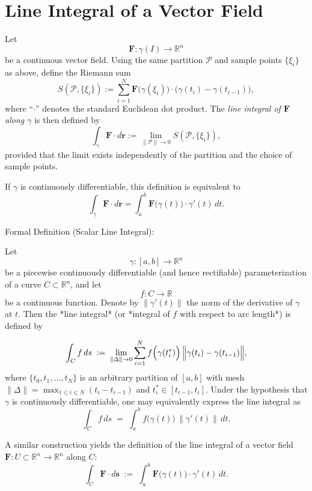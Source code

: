 \documentclass[11pt,openany]{article}
\begin{document}
\section*{Line Integral of a Vector Field}
Let 
\[
\mathbf{F} : \gamma(I) \to \mathbb{R}^n
\]
be a continuous vector field. Using the same partition \(\mathcal{P}\) and sample points \(\{\xi_i\}\) as above, define the Riemann sum
\[
S(\mathcal{P}, \{\xi_i\}) := \sum_{i=1}^N \mathbf{F}\bigl(\gamma(\xi_i)\bigr) \cdot \bigl(\gamma(t_i)-\gamma(t_{i-1})\bigr),
\]
where ``\(\cdot\)'' denotes the standard Euclidean dot product. The \emph{line integral of \(\mathbf{F}\) along \(\gamma\)} is then defined by
\[
\int_{\gamma} \mathbf{F} \cdot d\mathbf{r} := \lim_{\|\mathcal{P}\| \to 0} S(\mathcal{P}, \{\xi_i\}),
\]
provided that the limit exists independently of the partition and the choice of sample points.

If \(\gamma\) is continuously differentiable, this definition is equivalent to
\[
\int_{\gamma} \mathbf{F} \cdot d\mathbf{r} = \int_a^b \mathbf{F}\bigl(\gamma(t)\bigr) \cdot \gamma'(t)\,dt.
\]

\newpage
Formal Definition (Scalar Line Integral):

Let 
\[
\gamma : [a,b] \longrightarrow \mathbb{R}^n
\]
be a piecewise continuously differentiable (and hence rectifiable) parameterization of a curve \( C \subset \mathbb{R}^n \), and let 
\[
f : C \to \mathbb{R}
\]
be a continuous function. Denote by \(\|\gamma'(t)\|\) the norm of the derivative of \(\gamma\) at \(t\). Then the *line integral* (or *integral of \(f\) with respect to arc length*) is defined by

\[
\int_C f\, ds \; := \; \lim_{\|\Delta\|\to 0} \sum_{i=1}^{N} f\Bigl(\gamma(t_i^*)\Bigr)\,\Bigl\|\gamma(t_i)-\gamma(t_{i-1})\Bigr\|,
\]
where \(\{t_0, t_1, \dots, t_N\}\) is an arbitrary partition of \([a,b]\) with mesh \(\|\Delta\| = \max_{1 \le i \le N}(t_i-t_{i-1})\) and \(t_i^* \in [t_{i-1}, t_i]\). Under the hypothesis that \(\gamma\) is continuously differentiable, one may equivalently express the line integral as
\[
\int_C f\, ds \; = \; \int_a^b f\bigl(\gamma(t)\bigr)\,\|\gamma'(t)\|\,dt.
\]

A similar construction yields the definition of the line integral of a vector field \(\mathbf{F} : U \subset \mathbb{R}^n \to \mathbb{R}^n\) along \(C\):
\[
\int_C \mathbf{F} \cdot d\mathbf{s} \; := \; \int_a^b \mathbf{F}\bigl(\gamma(t)\bigr) \cdot \gamma'(t)\,dt.
\]
\end{document}

